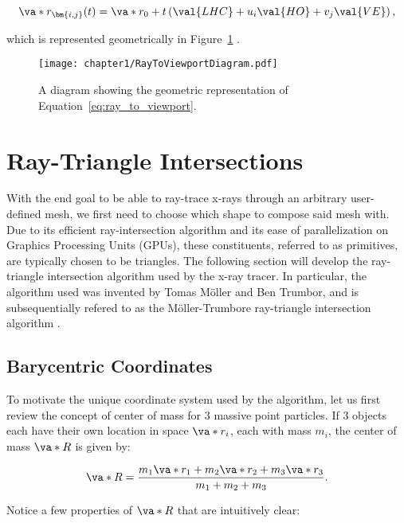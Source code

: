 \begin{equation}
  \va*{r}_{\bm{i,j}}(t) = \va*{r_0} + t \left( \val{LHC} + u_i \val{HO}  + v_j \val{VE} \right),
  \label{eq:ray_to_viewport}
\end{equation}

\noindent which is represented geometrically in Figure~\ref{fig:ray_to_viewport_diagram} \cite{Shirley}.

\begin{figure}[H]
  \centering
\texttt{[image: chapter1/RayToViewportDiagram.pdf]}
\caption{A diagram showing the geometric representation of Equation~\ref{eq:ray_to_viewport}.}
\label{fig:ray_to_viewport_diagram}
\end{figure}

\section{Ray-Triangle Intersections}
\par With the end goal to be able to ray-trace x-rays through an arbitrary user-defined mesh, we first need to choose which shape to compose said mesh with. Due to its efficient ray-intersection algorithm and its ease of parallelization on Graphics Processing Units (GPUs), these constituents, referred to as primitives, are typically chosen to be triangles. The following section will develop the ray-triangle intersection algorithm used by the x-ray tracer. In particular, the algorithm used was invented by Tomas Möller and Ben Trumbor, and is subsequentially refered to as the Möller-Trumbore ray-triangle intersection algorithm \cite{moller2005fast}. 

\subsection{Barycentric Coordinates}
\par To motivate the unique coordinate system used by the algorithm, let us first review the concept of center of mass for 3 massive point particles. If 3 objects each have their own location in space $\va*{r_i}$, each with mass $m_i$, the center of mass $\va*{R}$ is given by:

\begin{equation}
  \va*{R} = \frac{m_1 \va*{r_1} + m_2 \va*{r_2} + m_3 \va*{r_3}}{m_1 + m_2 + m_3}.
  \label{eq:com}
\end{equation}

Notice a few properties of $\va*{R}$ that are intuitively clear:

